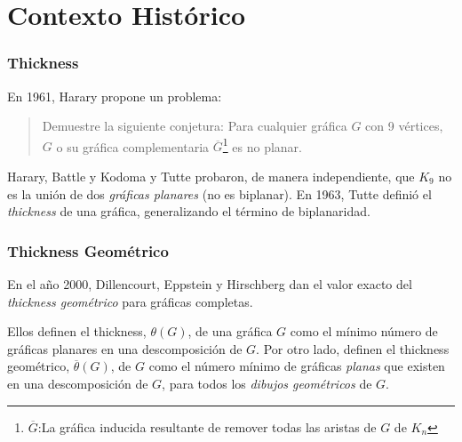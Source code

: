 \section{Contexto Histórico}
\begin{frame}\frametitle{Thickness}
	\begin{figure}
		\centering
		\quad\quad\quad
	\end{figure}
	En 1961, Harary propone un problema:
	\begin{quotation}
		Demuestre la siguiente conjetura: Para cualquier gráfica $G$ con 9 vértices, $G$ o su gráfica complementaria $\overline{G}$\let\thefootnote\relax\footnote{$\overline{G}$:La gráfica inducida resultante de remover todas las aristas de $G$ de $K_n$} es no planar.
	\end{quotation}
	Harary, Battle y Kodoma y Tutte probaron, de manera independiente, que $K_9$ no es la unión de dos \emph{gráficas planares} (no es biplanar). En 1963, Tutte definió el \emph{thickness} de una gráfica, generalizando el término de biplanaridad. 
	\let\thefootnote\svthefootnote
\end{frame}
\begin{frame}\frametitle{Thickness Geométrico}
	En el año 2000, Dillencourt, Eppstein y Hirschberg dan el valor exacto del \emph{thickness geométrico} para gráficas completas.
	
 	Ellos definen el thickness, $\theta(G)$, de una gráfica $G$ como el mínimo número de gráficas planares en una descomposición de $G$. Por otro lado, definen el thickness geométrico, $\overline{\theta}(G)$, de $G$ como el número mínimo de gráficas \emph{planas} que existen en una descomposición de $G$, para todos los \emph{dibujos geométricos} de $G$.
\end{frame}
